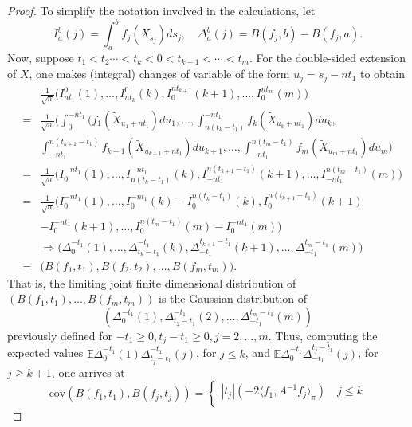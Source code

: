\documentclass[10pt,a4paper]{amsart}
\begin{document}
\begin{proof}
To simplify the notation involved in the calculations,
let 
\begin{equation}I_a^b(j) = \int_a^bf_j(X_{s_j})ds_j,\quad 
\Delta_a^b(j) = B(f_j,b)-B(f_j,a).\end{equation}
Now, suppose $t_1<t_2\cdots<t_k<0<t_{k+1}<\cdots < t_m$.
For the double-sided extension of $X$, one makes  (integral) changes
 of variable of the form $u_j = s_j-nt_1$ to obtain 
 \begin{eqnarray}
 &&\frac{1}{\sqrt{n}}\bigg(I_{nt_1}^0(1),\dots,I_{nt_k}^0(k),
 I_{0}^{nt_{k+1}}(k+1),\dots,I_0^{nt_m}(m)\bigg)\nonumber\\
 &=&\frac{1}{\sqrt{n}}\bigg(\int_0^{-nt_1}(f_1(\tilde{X}_{u_1+nt_1})du_1,\dots,\int_{n(t_k-t_1)}^{-nt_1}f_k(\tilde{X}_{u_k+nt_1})du_k,\nonumber\nonumber\\
 &&\int_{-{nt_1}}^{n(t_{k+1}-t_1)}f_{k+1}(\tilde{X}_{u_{k+1}+nt_1})du_{k+1},\dots,\int_{-nt_1}^{n(t_m-t_1)}f_m(\tilde{X}_{u_m+nt_1})du_m\bigg)\nonumber\\
&=&\frac{1}{\sqrt{n}}\bigg(I_0^{-nt_1}(1),\dots,I_{n(t_k-t_1)}^{-nt_1}(k),
 I_{-{nt_1}}^{n(t_{k+1}-t_1)}(k+1),\dots,I_{-nt_1}^{n(t_m-t_1)}(m)\bigg)\nonumber\\
&=&\frac{1}{\sqrt{n}}\bigg(I_0^{-nt_1}(1),\dots,
I_0^{-nt_1}(k)
-I_0^{n(t_k-t_1)}(k),
 I_{0}^{n(t_{k+1}-t_1)}(k+1)\nonumber\\
&&-I_0^{-nt_1}(k+1),\dots,
I_{0}^{n(t_m-t_1)}(m)
-I_{0}^{-nt_1}(m)\bigg)\nonumber\\
&&\Rightarrow \bigg(\Delta_0^{-t_1}(1),\dots,
\Delta^{-t_1}_{t_k-t_1}(k),
\Delta^{t_{k+1}-t_1}_{-t_1}(k+1),\dots,
\Delta^{t_m-t_1}_{-t_1}(m)\bigg)\nonumber\\
&=&\bigg(B(f_1,t_1),B(f_2,t_2),\dots,B(f_m,t_m)\bigg). 
 \end{eqnarray}
 That is, the limiting joint finite dimensional
  distribution of $(B(f_1,t_1),\dots,B(f_m,t_m))$ is the Gaussian distribution of 
  $$(\Delta_0^{-t_1}(1),\Delta^{-t_1}_{t_2-t_1}(2),\dots,
  \Delta^{t_m-t_1}_{-t_1}(m))$$
  previously defined for $-t_1\ge 0, t_j-t_1\ge 0, j=2,\dots,m$. 
Thus, computing the expected values
 $\mathbb{E}\Delta^{-t_1}_0(1)\Delta^{-t_1}_{t_j-t_1}(j)$, for $j\le k$, 
 and  $\mathbb{E}\Delta^{-t_1}_0\Delta^{t_j-t_1}_{-t_1}(j)$,
 for  $j\ge k+1$,
 one arrives at 
  \begin{equation}\label{covform1}
\text{cov}(B(f_1,t_1),B(f_j,t_j))
  =\begin{cases} |t_j|
  (-2\langle f_1, A^{-1}f_j\rangle_\pi)\quad j\le k\\

\end{cases}
\end{equation}
\end{proof}
\end{document}
